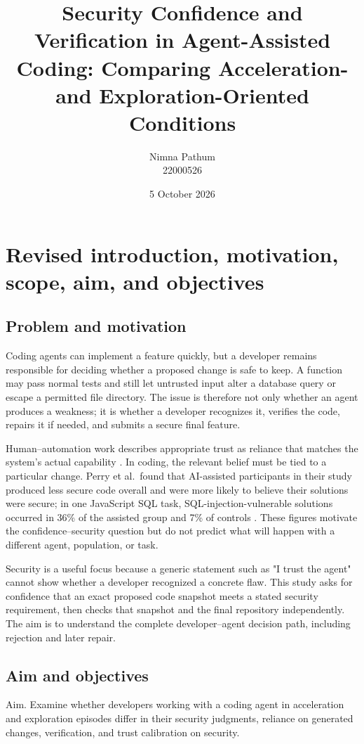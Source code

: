\documentclass[12pt,a4paper]{article}
\title{Security Confidence and Verification in Agent-Assisted Coding: Comparing Acceleration- and Exploration-Oriented Conditions}
\author{Nimna Pathum\\22000526}
\date{5 October 2026}
\begin{document}
\maketitle
\thispagestyle{empty}
\newpage

\section{Revised introduction, motivation, scope, aim, and objectives}

\subsection{Problem and motivation}
Coding agents can implement a feature quickly, but a developer remains responsible for deciding whether a proposed change is safe to keep. A function may pass normal tests and still let untrusted input alter a database query or escape a permitted file directory. The issue is therefore not only whether an agent produces a weakness; it is whether a developer recognizes it, verifies the code, repairs it if needed, and submits a secure final feature.

Human--automation work describes appropriate trust as reliance that matches the system's actual capability \cite{lee2004,okamura2020}. In coding, the relevant belief must be tied to a particular change. Perry et al.\ found that AI-assisted participants in their study produced less secure code overall and were more likely to believe their solutions were secure; in one JavaScript SQL task, SQL-injection-vulnerable solutions occurred in 36\% of the assisted group and 7\% of controls \cite{perry2023}. These figures motivate the confidence--security question but do not predict what will happen with a different agent, population, or task.

Security is a useful focus because a generic statement such as "I trust the agent" cannot show whether a developer recognized a concrete flaw. This study asks for confidence that an exact proposed code snapshot meets a stated security requirement, then checks that snapshot and the final repository independently. The aim is to understand the complete developer--agent decision path, including rejection and later repair.

\subsection{Aim and objectives}
Aim. Examine whether developers working with a coding agent in acceleration and exploration episodes differ in their security judgments, reliance on generated changes, verification, and trust calibration on security.
\end{document}
